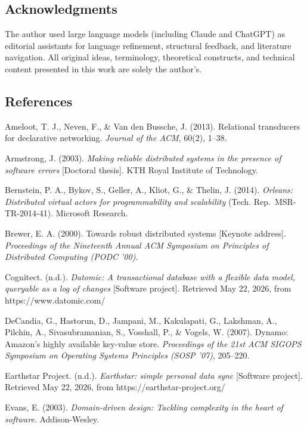 \documentclass[
]{article}
\begin{document}
\subsection{Acknowledgments}\label{acknowledgments}

The author used large language models (including Claude and ChatGPT) as
editorial assistants for language refinement, structural feedback, and
literature navigation. All original ideas, terminology, theoretical
constructs, and technical content presented in this work are solely the
author's.

\subsection{References}\label{references}

Ameloot, T. J., Neven, F., \& Van den Bussche, J. (2013). Relational
transducers for declarative networking. \emph{Journal of the ACM},
60(2), 1--38.

Armstrong, J. (2003). \emph{Making reliable distributed systems in the
presence of software errors} {[}Doctoral thesis{]}. KTH Royal Institute
of Technology.

Bernstein, P. A., Bykov, S., Geller, A., Kliot, G., \& Thelin, J.
(2014). \emph{Orleans: Distributed virtual actors for programmability
and scalability} (Tech. Rep.~MSR-TR-2014-41). Microsoft Research.

Brewer, E. A. (2000). Towards robust distributed systems {[}Keynote
address{]}. \emph{Proceedings of the Nineteenth Annual ACM Symposium on
Principles of Distributed Computing (PODC '00)}.

Cognitect. (n.d.). \emph{Datomic: A transactional database with a
flexible data model, queryable as a log of changes} {[}Software
project{]}. Retrieved May 22, 2026, from https://www.datomic.com/

DeCandia, G., Hastorun, D., Jampani, M., Kakulapati, G., Lakshman, A.,
Pilchin, A., Sivasubramanian, S., Vosshall, P., \& Vogels, W. (2007).
Dynamo: Amazon's highly available key-value store. \emph{Proceedings of
the 21st ACM SIGOPS Symposium on Operating Systems Principles (SOSP
'07)}, 205--220.

Earthstar Project. (n.d.). \emph{Earthstar: simple personal data sync}
{[}Software project{]}. Retrieved May 22, 2026, from
https://earthstar-project.org/

Evans, E. (2003). \emph{Domain-driven design: Tackling complexity in the
heart of software}. Addison-Wesley.
\end{document}
